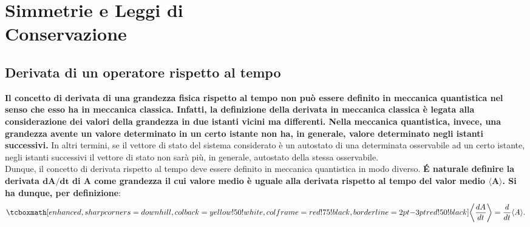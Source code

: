 \documentclass[a4paper,12pt,oneside]{book}
\newcommand*{\myfont}{\fontfamily{ppl}\selectfont}
\begin{document}
\fancypagestyle{plain}{%
\fancyhf{} %
\fancyfoot[C]{\bfseries \myfont{\thepage}} %
\renewcommand{\headrulewidth}{0pt}
\renewcommand{\footrulewidth}{0pt}}

\fancypagestyle{VS}{
\headheight = 15pt
\lhead[\myfont{\textit{\textbf{\thechapter\nouppercase{\leftmark}}}}]{\myfont{\textit{\textbf{\nouppercase{\leftmark}}}}}
\chead[]{}
\rhead[\myfont{\textbf{\thepage}}]{\myfont{\textbf{\thepage}}}

\lfoot[]{}
\cfoot[]{}
\rfoot[]{}
}



\pagestyle{VS}
\setcounter{chapter}{11}
\setcounter{page}{137}
\chapter[Simmetrie e Leggi di Conservazione]{Simmetrie e Leggi di\\ Conservazione} 
\section{Derivata di un operatore rispetto al tempo} 

\textbf{Il concetto di derivata di una grandezza fisica rispetto al tempo non può essere definito in meccanica quantistica nel senso che esso ha in meccanica classica. Infatti, la definizione della derivata in meccanica classica è legata alla considerazione dei valori della grandezza in due istanti vicini ma differenti. Nella meccanica quantistica, invece, una grandezza avente un valore determinato in un certo istante non ha, in generale, valore determinato negli istanti successivi.} In altri termini, se il vettore di stato del sistema considerato è un autostato di una determinata osservabile ad un certo istante, negli istanti successivi il vettore di stato non sarà più, in generale, autostato della stessa osservabile.\\

Dunque, il concetto di derivata rispetto al tempo deve essere definito in meccanica quantistica in modo diverso.
\textbf{\'E naturale definire la derivata $\mathbf{{dA}/{dt}}$ di A come grandezza il cui valore medio è uguale alla derivata rispetto al tempo del valor medio $\mathbf{\langle A \rangle} $.
Si ha dunque, per definizione}:
	\begin{equation}
		\tcboxmath[enhanced, sharp corners=downhill, colback=yellow!50!white, colframe=red!75!black, borderline={2pt}{-3pt}{red!50!black}]{
		\left\langle \frac{dA}{dt} \right\rangle = \frac{d}{dt} \langle A \rangle .
		}
	\end{equation}\\
\end{document}
